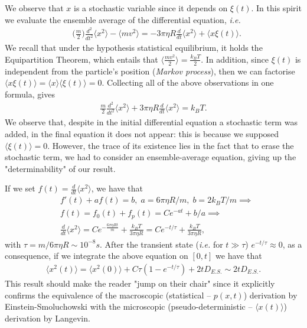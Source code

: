 We observe that $x$ is a stochastic variable since it depends on $\xi(t)$.
In this spirit we evaluate the ensemble average of the differential equation, \textit{i.e.}
\begin{equation}\begin{split}
	&\bigg(\frac{m}{2}\bigg)\frac{d^2}{dt^2}\langle x^2 \rangle-\langle mv^2\rangle =-3\pi\eta R\frac{d}{dt}\langle x^2\rangle +\langle x\xi(t)\rangle.
\end{split}\end{equation}
We recall that under the hypothesis statistical equilibrium, it holds the Equipartition Theorem\cite{Sethna2021}, which entails that $\langle \frac{mv^2}{2}\rangle=\frac{k_BT}{2}$.
In addition, since $\xi(t)$ is independent from the particle's position (\textit{Markov process}), then we can factorise $\langle x\xi(t)\rangle =\langle x\rangle \langle \xi(t)\rangle=0$.
Collecting all of the above observations in one formula, gives
\begin{equation}\begin{split}
	\frac{m}{2}\frac{d^2}{dt^2}\langle x^2 \rangle +3\pi\eta R\frac{d}{dt}\langle x^2\rangle =k_BT.
\end{split}\end{equation}
We observe that, despite in the initial differential equation a stochastic term was added, in the final equation it does not appear: this is because we supposed $\langle \xi(t)\rangle =0$.
However, the trace of its existence lies in the fact that to erase the stochastic term, we had to consider an ensemble-average equation, giving up the "determinability" of our result.

If we set $f(t)=\frac{d}{dt}\langle x^2\rangle$, we have that
\begin{equation}\begin{split}
	&f'(t)+af(t)=b, \;a=6\pi\eta R/m, \;b=2k_BT/m\implies\\
	&f(t)=f_0(t)+f_p(t)=Ce^{-at}+b/a\implies\\
	&\frac{d}{dt}\langle x^2\rangle =Ce^{-\frac{6\pi\eta R t}{m}}+\frac{k_BT}{3\pi\eta R}=Ce^{-t/\tau}+\frac{k_BT}{3\pi\eta R},
\end{split}\end{equation}
with $\tau=m/6\pi\eta R\sim 10^{-8}s$.
After the transient state (\textit{i.e.} for $t\gg\tau$) $e^{-t/\tau}\approx 0$, as a consequence, if we integrate the above equation on $[0,t]$ we have that
\begin{equation}\begin{split}
	\langle x^2(t)\rangle =\langle x^2(0)\rangle+C\tau(1-e^{-t/\tau})+2tD_{E.S.}\sim2tD_{E.S.}.
\end{split}\end{equation}
This result should make the reader "jump on their chair" since it explicitly confirms the equivalence of the macroscopic (statistical -- $p(x,t)$) derivation by Einstein-Smoluchowski with the microscopic (pseudo-deterministic -- $\langle x(t)\rangle$) derivation by Langevin.


